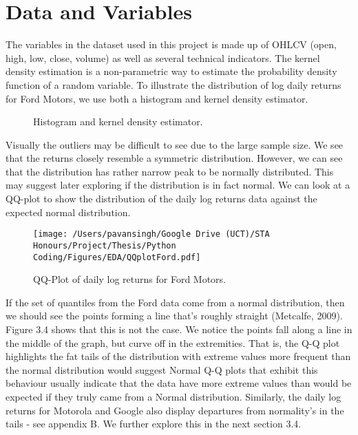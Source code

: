\section{Data and Variables}

The variables in the dataset used in this project is made up of OHLCV (open, high, low, close, volume) as well as several technical indicators. The kernel density estimation is a non-parametric way to estimate the probability density function of a random variable. To illustrate the distribution of log daily returns for Ford Motors, we use both a histogram and kernel density estimator.

\begin{figure}[h]
    \centering
    \qquad
    \caption{Histogram and kernel density estimator.}%
    \label{}%
\end{figure}

Visually the outliers may be difficult to see due to the large sample size. We see that the returns closely resemble a symmetric distribution. However, we can see that the distribution has rather narrow peak to be normally distributed. This may suggest later exploring if the distribution is in fact normal. We can look at a QQ-plot to show the distribution of the daily log returns data against the expected normal distribution.


\begin{figure}[h]
\centering
  \texttt{[image: /Users/pavansingh/Google Drive (UCT)/STA Honours/Project/Thesis/Python Coding/Figures/EDA/QQplotFord.pdf]}
  \caption{QQ-Plot of daily log returns for Ford Motors.}
  \label{}
\end{figure}

If the set of quantiles from the Ford data come from a normal distribution, then we should see the points forming a line that’s roughly straight (Metcalfe, 2009). Figure 3.4 shows that this is not the case. We notice the points fall along a line in the middle of the graph, but curve off in the extremities. That is, the Q-Q plot highlights the fat tails of the distribution with extreme values more frequent than the normal distribution would suggest 
Normal Q-Q plots that exhibit this behaviour usually indicate that the data have more extreme values than would be expected if they truly came from a Normal distribution. Similarly, the daily log returns for Motorola and Google also display departures from normality’s in the tails - see appendix B. We further explore this in the next section 3.4.

